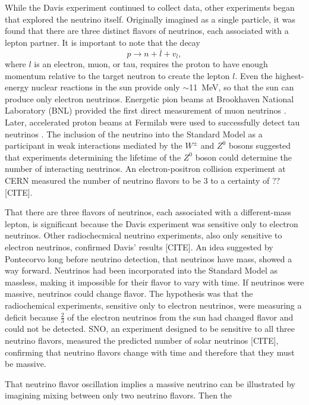 While the Davis experiment continued to collect data, other experiments began that explored the neutrino itself.  Originally imagined as a single particle, it was found that there are three distinct flavors of neutrinos, each associated with a lepton partner.  It is important to note that the decay 
\begin{equation}
p \rightarrow n + \overline{l} + v_l,
\end{equation}
where $l$ is an electron, muon, or tau, requires the proton to have enough momentum relative to the target neutron to create the lepton $l$.  Even the highest-energy nuclear reactions in the sun provide only $\sim$11~MeV, so that the sun can produce only electron neutrinos.  Energetic pion beams at Brookhaven National Laboratory (BNL) provided the first direct measurement of muon neutrinos \cite{muonNeutrino}.  Later, accelerated proton beams at Fermilab were used to successfully detect tau neutrinos \cite{tauNeutrino}.  The inclusion of the neutrino into the Standard Model as a participant in weak interactions mediated by the $W^{\pm}$ and $Z^0$ bosons suggested that experiments determining the lifetime of the $Z^0$ boson could determine the number of interacting neutrinos.  An electron-positron collision experiment at CERN measured the number of neutrino flavors to be 3 to a certainty of ?? [CITE].

That there are three flavors of neutrinos, each associated with a different-mass lepton, is significant because the Davis experiment was sensitive only to electron neutrinos.  Other radiochecmical neutrino experiments, also only sensitive to electron neutrinos, confirmed Davis' results [CITE].  An idea suggested by Pontecorvo long before neutrino detection, that neutrinos have mass, showed a way forward.  Neutrinos had been incorporated into the Standard Model as massless, making it impossible for their flavor to vary with time.  If neutrinos were massive, neutrinos could change flavor.  The hypothesis was that the radiochemical experiments, sensitive only to electron neutrinos, were measuring a deficit because $\frac{2}{3}$ of the electron neutrinos from the sun had changed flavor and could not be detected.  SNO, an experiment designed to be sensitive to all three neutrino flavors, measured the predicted number of solar neutrinos [CITE], confirming that neutrino flavors change with time and therefore that they must be massive.

That neutrino flavor oscillation implies a massive neutrino can be illustrated by imagining mixing between only two neutrino flavors.  Then the 




